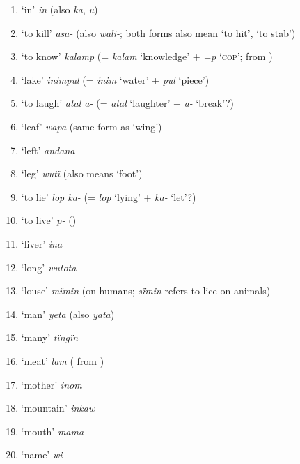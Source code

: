 \begin{enumerate}[noitemsep, label={\arabic*}, align=left, widest=190, labelsep=1ex,leftmargin=*]
\item ‘in’ \textit{in} (also \textit{ka}, \textit{u})

\item ‘to kill’ \textit{asa-} (also \textit{wali-}; both forms also mean ‘to hit’, ‘to stab’)

\item ‘to know’ \textit{kalamp} (= \textit{kalam} ‘knowledge’ + \textit{=p} ‘\textsc{cop}’;  from )

\item ‘lake’ \textit{inimpul} (= \textit{inim} ‘water’ + \textit{pul} ‘piece’)

\item ‘to laugh’ \textit{atal a-} (= \textit{atal} ‘laughter’ + \textit{a-} ‘break’?)

\item ‘leaf’ \textit{wapa} (same form as ‘wing’)

\item ‘left’ \textit{andana}

\item ‘leg’ \textit{wutï} (also means ‘foot’)

\item ‘to lie’ \textit{lop ka-} (= \textit{lop} ‘lying’ + \textit{ka-} ‘let’?)

\item ‘to live’ \textit{p-} ()

\item ‘liver’ \textit{ina}

\item ‘long’ \textit{wutota}

\item ‘louse’ \textit{mïmin} (on humans; \textit{sïmin} refers to lice on animals)

\item ‘man’ \textit{yeta} (also \textit{yata})

\item ‘many’ \textit{tïngïn}

\item ‘meat’ \textit{lam} ( from )

\item ‘mother’ \textit{inom}

\item ‘mountain’ \textit{inkaw}

\item ‘mouth’ \textit{mama}

\item ‘name’ \textit{wi}


\end{enumerate}
